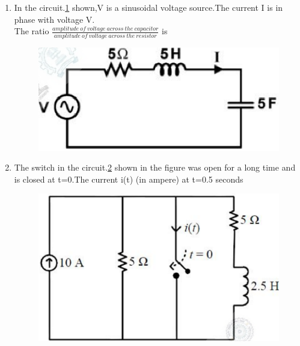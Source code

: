 \documentclass[journal,12pt,twocolumn]{IEEEtran}
\begin{document}
\begin{enumerate}
\item In the circuit.\ref{fig108} shown,V is a sinusoidal voltage source.The current I is in phase with voltage V.\\The ratio $\frac{amplitude \ of\  voltage\ across\ the\ capacitor}{amplitude\ of\ voltage\ across\ the\ resistor}$ is
\begin{figure}[!h]
\begin{center}
\includegraphics[scale=0.7]{./figs/fig108.eps}
\caption{}
\label{fig108}
\end{center}
\end{figure}

\item The switch in the circuit.\ref{fig109} shown in the figure was open for a long time and is closed at t=0.The current i(t) (in ampere) at t=0.5 seconds
\begin{figure}[!h]
\begin{center}
\includegraphics[scale=0.5]{./figs/fig109.eps}
\caption{}
\label{fig109}
\end{center}
\end{figure}


\end{enumerate}
\end{document}

